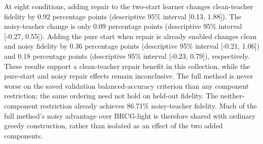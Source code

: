 At eight conditions, adding repair to the two-start learner changes clean-teacher fidelity by 0.92 percentage points (descriptive 95\% interval [0.13, 1.88]). The noisy-teacher change is only 0.09 percentage points (descriptive 95\% interval [-0.27, 0.55]). Adding the pure start when repair is already enabled changes clean and noisy fidelity by 0.36 percentage points (descriptive 95\% interval [-0.21, 1.06]) and 0.18 percentage points (descriptive 95\% interval [-0.23, 0.79]), respectively. These results support a clean-teacher repair benefit in this collection, while the pure-start and noisy repair effects remain inconclusive. The full method is never worse on the saved validation balanced-accuracy criterion than any component restriction; the same ordering need not hold on held-out fidelity.
The neither-component restriction already achieves 86.71\% noisy-teacher fidelity. Much of the full method's noisy advantage over BRCG-light is therefore shared with ordinary greedy construction, rather than isolated as an effect of the two added components.
